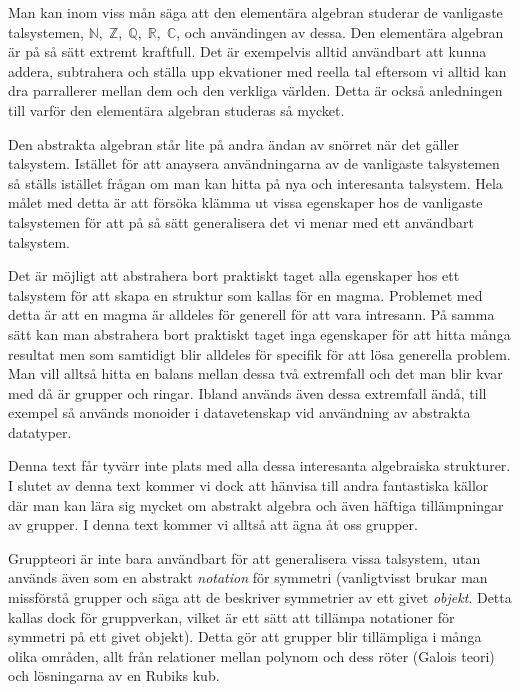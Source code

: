 \documentclass{article}
\theoremstyle{definition}
\begin{document}
Man kan inom viss mån säga att den elementära algebran studerar de 
vanligaste talsystemen, $\mathbb{N}, \; \mathbb{Z}, \; \mathbb{Q}, \; \mathbb{R}, \; \mathbb{C}$,
och användingen av dessa.
Den elementära algebran är på så sätt 
extremt kraftfull. Det är exempelvis alltid användbart att kunna addera, subtrahera och 
ställa upp ekvationer 
med reella tal eftersom vi alltid kan dra parrallerer mellan dem
och den verkliga världen. Detta är också anledningen till varför den elementära algebran
studeras så mycket. 

Den abstrakta algebran står lite på andra ändan av snörret när det gäller 
talsystem. Istället för att anaysera användningarna av de vanligaste talsystemen så 
ställs istället frågan om man kan hitta på nya och interesanta talsystem. Hela målet med detta är att försöka klämma ut vissa egenskaper hos de vanligaste 
talsystemen för att på så sätt generalisera det vi menar med ett användbart talsystem.

Det är möjligt att abstrahera bort praktiskt taget alla egenskaper hos ett talsystem för att skapa en struktur som kallas för en magma. Problemet med detta är att en
magma är alldeles för generell för att vara intresann. På samma sätt kan man abstrahera bort praktiskt taget inga egenskaper för att hitta
många resultat men som samtidigt blir alldeles för specifik för att lösa generella problem. Man vill alltså hitta en balans mellan dessa två extremfall och det man blir kvar med då är grupper och 
ringar. Ibland används även dessa extremfall ändå, till exempel så används monoider i datavetenskap vid användning av abstrakta datatyper. 

Denna text får tyvärr inte plats med alla dessa interesanta algebraiska strukturer. I slutet av denna text kommer vi dock att hänvisa till andra fantastiska källor där man
kan lära sig mycket om abstrakt algebra och även häftiga tillämpningar av grupper. I denna text kommer vi alltså att ägna åt oss grupper. 

Gruppteori är inte bara användbart för att generalisera vissa talsystem, utan används även som en abstrakt \textit{notation} för symmetri (vanligtvisst brukar man 
missförstå grupper och säga att de beskriver symmetrier av ett givet \textit{objekt}. Detta kallas dock för gruppverkan, vilket är ett sätt att tillämpa notationer för symmetri på ett givet objekt).
Detta gör att grupper blir tillämpliga i många olika områden, allt från relationer mellan polynom och dess röter (Galois teori) och lösningarna av en Rubiks kub.
\end{document}
